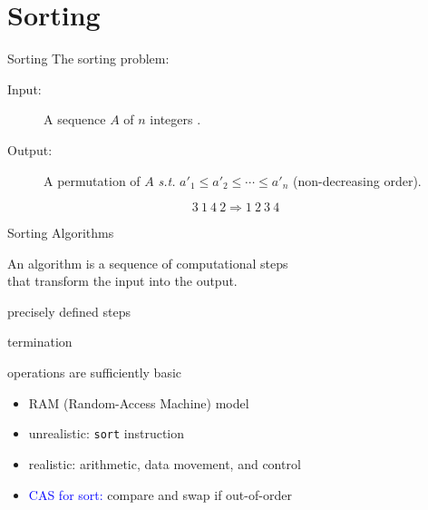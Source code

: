 \section{Sorting}

\begin{frame}{Sorting}
  The sorting problem:
  \begin{description}
	\item[Input:] A sequence $A$ of $n$ integers .
	\item[Output:] A permutation  of $A$ \emph{s.t.} $a'_1 \le a'_2 \le \cdots \le a'_n$ {\small (non-decreasing order)}.
  \end{description}

  \pause

  \[
	3\ 1\ 4\ 2 \Longrightarrow 1\ 2\ 3\ 4
  \]



\end{frame}
\begin{frame}{Sorting Algorithms}
  \begin{center}
	An algorithm is a sequence of computational steps \\
	that transform the input into the output.
  \end{center}

  \pause

  \begin{description}[<+->][Effectiveness:]
	\item[Definiteness:] precisely defined steps
	\item[Finiteness:] termination
	\item[Effectiveness:] operations are sufficiently basic
	  \begin{itemize}
		\item RAM {\scriptsize (Random-Access Machine)} model
		\item unrealistic: \texttt{sort} instruction
		\item realistic: arithmetic, data movement, and control
		\item \textcolor{blue}{CAS for sort:} compare and swap if out-of-order
	  \end{itemize}
  \end{description}
\end{frame}
